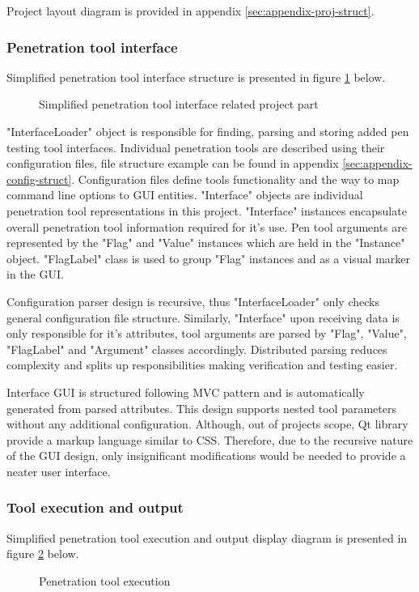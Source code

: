 Project layout diagram is provided in appendix \ref{sec:appendix-proj-struct}.


\subsubsection{Penetration tool interface}
Simplified penetration tool interface structure is presented in figure \ref {fig:interface-struct} below. \newline

\begin{figure}[!htb]
	\caption{\label{fig:interface-struct} Simplified penetration tool interface related project part}
\end{figure}

"InterfaceLoader" object is responsible for finding, parsing and storing added pen testing tool interfaces. Individual penetration tools are described using their configuration files, file structure example can be found in appendix \ref{sec:appendix-config-struct}. Configuration files define tools functionality and the way to map command line options to GUI entities. "Interface" objects are individual penetration tool representations in this project. "Interface" instances encapsulate overall penetration tool information required for it's use. Pen tool arguments are represented by the "Flag" and "Value" instances which are held in the "Instance" object. "FlagLabel" class is used to group "Flag" instances and as a visual marker in the GUI. 

Configuration parser design is recursive, thus "InterfaceLoader" only checks general configuration file structure. Similarly, "Interface" upon receiving data is only responsible for it's attributes, tool arguments are parsed by "Flag", "Value", "FlagLabel" and "Argument" classes accordingly. Distributed parsing reduces complexity and splits up responsibilities making verification and testing easier.

Interface GUI is structured following MVC pattern and is automatically generated from parsed attributes. This design supports nested tool parameters without any additional configuration. Although, out of projects scope, Qt library provide a markup language similar to CSS. Therefore, due to the recursive nature of the GUI design, only insignificant modifications would be needed to provide a neater user interface.


\subsubsection{Tool execution and output}
Simplified penetration tool execution and output display diagram is presented in figure \ref{fig:manager-struct} below.
\begin{figure}[!htb]
	\caption{\label{fig:manager-struct} Penetration tool execution}
\end{figure}


